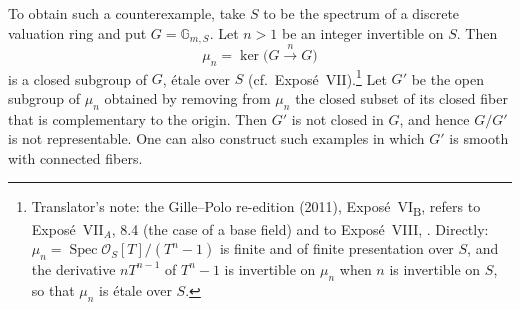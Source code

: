 To obtain such a counterexample, take \(S\) to be the spectrum
of a discrete valuation ring and put \(G=\mathbb G_{m,S}\).
Let \(n>1\) be an integer invertible on \(S\). Then
\label{form:sga3-VIB-9.3-mu-n}%
\[
  \mu_n=\ker\bigl(G\xrightarrow{\ n\ }G\bigr)
\]
is a closed subgroup of \(G\), \'etale over \(S\)
(cf.\ Expos\'e~VII).\footnote{Translator's note: the Gille--Polo re-edition (2011),
Expos\'e~VI\textsubscript{B}, refers to Expos\'e~VII\(_A\), 8.4 (the case of a base field) and to
Expos\'e~VIII, . Directly: \(\mu_n=\operatorname{Spec}\mathcal O_S[T]/(T^n-1)\) is finite and of
finite presentation over \(S\), and the derivative \(nT^{n-1}\) of \(T^n-1\) is invertible on \(\mu_n\) when
\(n\) is invertible on \(S\), so that \(\mu_n\) is \'etale over \(S\).}
Let \(G'\) be the open subgroup of \(\mu_n\) obtained by
removing from \(\mu_n\) the closed subset of its closed fiber
that is complementary to the origin. Then \(G'\) is not closed
in \(G\), and hence \(G/G'\) is not representable. One can also
construct such examples in which \(G'\) is smooth with connected
fibers.

